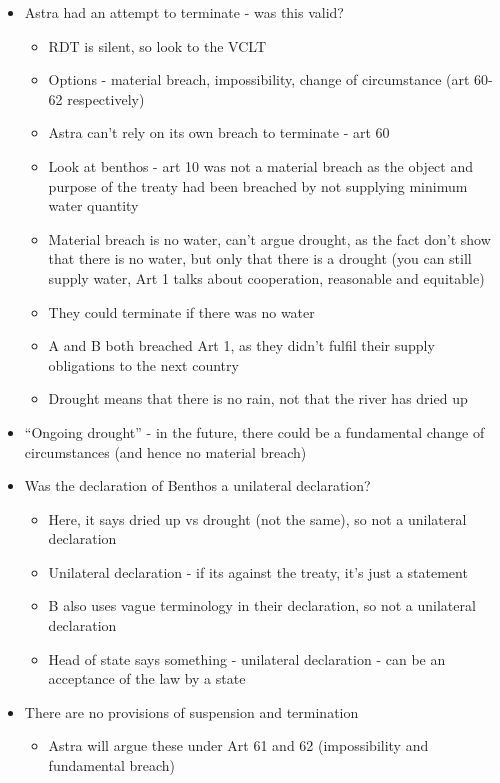 \begin{itemize}
    \item Astra had an attempt to terminate - was this valid?
    \begin{itemize}
        \item RDT is silent, so look to the VCLT
        \item Options - material breach, impossibility, change of circumstance (art 60-62 respectively)
        \item Astra can't rely on its own breach to terminate - art 60
        \item Look at benthos - art 10 was not a material breach as the object and purpose of the treaty had been breached by not supplying minimum water quantity
        \item Material breach is no water, can't argue drought, as the fact don't show that there is no water, but only that there is a drought (you can still supply water, Art 1 talks about cooperation, reasonable and equitable)
        \item They could terminate if there was no water
        \item A and B both breached Art 1, as they didn't fulfil their supply obligations to the next country
        \item Drought means that there is no rain, not that the river has dried up
    \end{itemize}
    \item ``Ongoing drought'' - in the future, there could be a fundamental change of circumstances (and hence no material breach)
    \item Was the declaration of Benthos a unilateral declaration?
    \begin{itemize}
        \item Here, it says dried up vs drought (not the same), so not a unilateral declaration
        \item Unilateral declaration - if its against the treaty, it's just a statement
        \item B also uses vague terminology in their declaration, so not a unilateral declaration
        \item Head of state says something - unilateral declaration - can be an acceptance of the law by a state        
    \end{itemize}
    \item There are no provisions of suspension and termination
    \begin{itemize}
        \item Astra will argue these under Art 61 and 62 (impossibility and fundamental breach)

\end{itemize}
\end{itemize}
